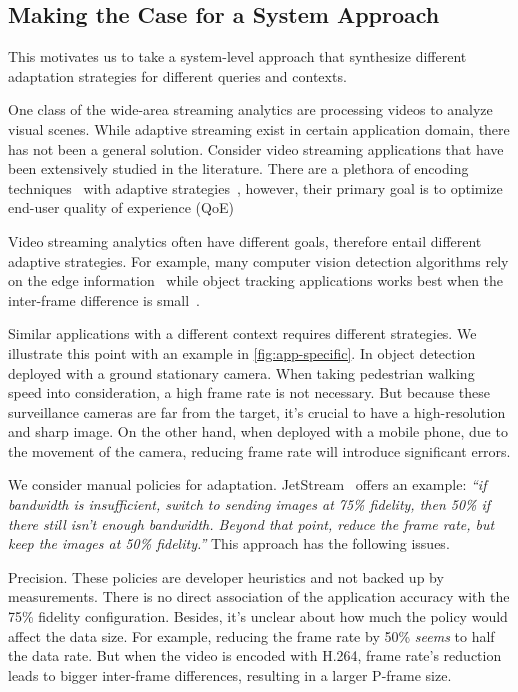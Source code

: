 \subsection{Making the Case for a System Approach}
\label{sec:making-case-sys-approach}

This motivates us to take a system-level approach that synthesize different
adaptation strategies for different queries and contexts.

 One class of the
wide-area streaming analytics are processing videos to analyze visual
scenes. While adaptive streaming exist in certain application domain, there has
not been a general solution. Consider video streaming applications that have
been extensively studied in the literature. There are a plethora of encoding
techniques~\cite{richardson2011h, grange2016vp9} with adaptive
strategies~\cite{yin2015control, michalos2012dynamic, pantos2016http}, however,
their primary goal is to optimize end-user quality of experience (QoE)

Video streaming analytics often have different goals, therefore entail different
adaptive strategies. For example, many computer vision detection algorithms rely
on the edge information~\cite{canny1986computational, lowe2004distinctive,
  viola2001rapid} while object tracking applications works best when the
inter-frame difference is small~\cite{allen2004object}.

Similar applications with a different context requires different strategies. We
illustrate this point with an example in \autoref{fig:app-specific}. In object
detection deployed with a ground stationary camera. When taking pedestrian
walking speed into consideration, a high frame rate is not necessary. But
because these surveillance cameras are far from the target, it's crucial to have
a high-resolution and sharp image. On the other hand, when deployed with a
mobile phone, due to the movement of the camera, reducing frame rate will
introduce significant errors.

 We consider manual policies for
adaptation. JetStream~\cite{rabkin2014aggregation} offers an example:
\textit{``if bandwidth is insufficient, switch to sending images at 75\%
  fidelity, then 50\% if there still isn't enough bandwidth. Beyond that point,
  reduce the frame rate, but keep the images at 50\% fidelity.''} This approach
has the following issues.

Precision. These policies are developer heuristics and not backed up by
measurements. There is no direct association of the application accuracy with
the 75\% fidelity configuration. Besides, it's unclear about how much the policy
would affect the data size. For example, reducing the frame rate by 50\%
\textit{seems} to half the data rate. But when the video is encoded with H.264,
frame rate's reduction leads to bigger inter-frame differences, resulting in a
larger P-frame size.


